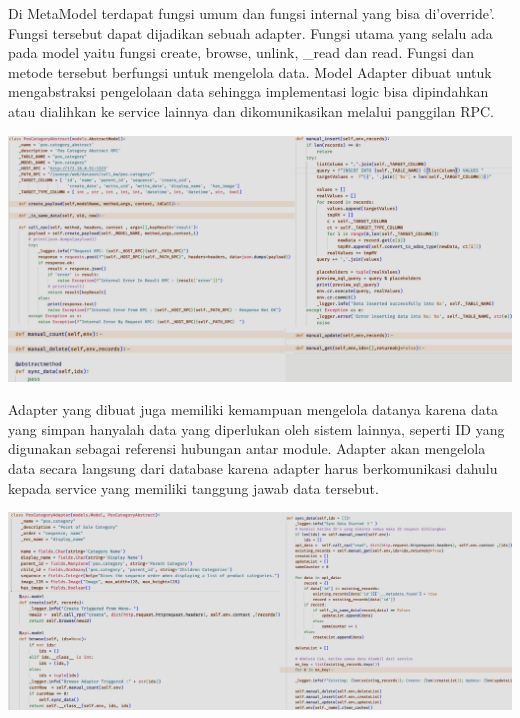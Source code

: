 Di MetaModel terdapat fungsi umum dan fungsi internal yang bisa di'override'. Fungsi tersebut dapat dijadikan sebuah adapter. Fungsi utama yang selalu ada pada model yaitu fungsi create, browse, unlink, \_read dan read. Fungsi dan metode tersebut berfungsi untuk mengelola data. Model Adapter dibuat untuk mengabstraksi pengelolaan data sehingga implementasi logic bisa dipindahkan atau dialihkan ke service lainnya dan dikomunikasikan melalui panggilan RPC.  


\begin{center}
	\includegraphics[width=14cm]{img/bab_4/strangle_1.png}
	\label{fig:strangle_1}
\end{center}

Adapter yang dibuat juga memiliki kemampuan mengelola datanya karena data yang simpan hanyalah data yang diperlukan oleh sistem lainnya, seperti ID yang digunakan sebagai referensi hubungan antar module. Adapter akan mengelola data secara langsung dari database karena adapter harus berkomunikasi dahulu kepada service yang memiliki tanggung jawab data tersebut.


\begin{center}
	\includegraphics[width=14cm]{img/bab_4/strangle_2.png}
	\label{fig:strangle_2}
\end{center}

